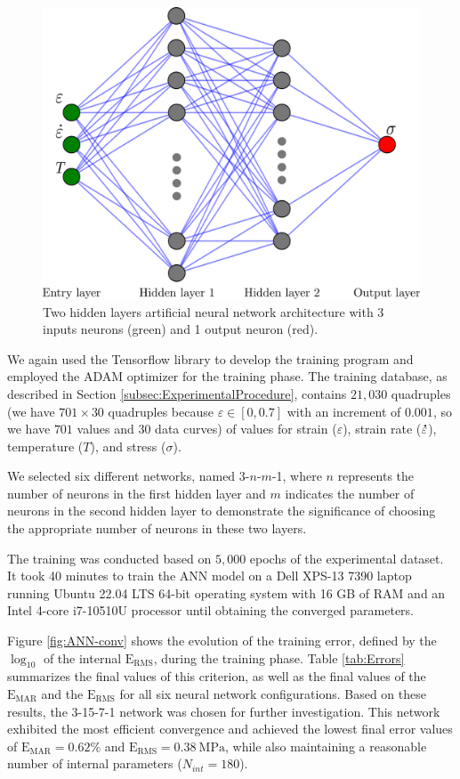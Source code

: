 \documentclass[metals,article,submit,pdftex,moreauthors]{Definitions/mdpi}
\DeclareRobustCommand{\mdot}[1]{\accentset{\mbox{\bfseries .}}{#1}}
\DeclareRobustCommand{\RMSE}{\text{E}_\text{RMS}}
\DeclareRobustCommand{\MARE}{\text{E}_\text{MAR}}
\DeclareRobustCommand{\MPa}{\text{MPa}}
\begin{document}
\begin{figure}[H]
\centering
\includegraphics[width=0.55\columnwidth]{Figures/ANN-scheme-2HL}
\caption{Two hidden layers artificial neural network architecture with 3 inputs neurons (green) and 1 output neuron (red).}
\label{fig:ANN-2HL}
\end{figure}

We again used the Tensorflow library to develop the training program and employed the ADAM optimizer for the training phase.
The training database, as described in Section \ref{subsec:ExperimentalProcedure}, contains $21,030$ quadruples (we have $701\times30$ quadruples because $\varepsilon\in[0,0.7]$ with an increment of $0.001$, so we have $701$ values and 30 data curves) of values for strain ($\varepsilon$), strain rate ($\mdot\varepsilon$), temperature ($T$), and stress ($\sigma$).

We selected six different networks, named 3-$n$-$m$-1, where $n$ represents the number of neurons in the first hidden layer and $m$ indicates the number of neurons in the second hidden layer to demonstrate the significance of choosing the appropriate number of neurons in these two layers.

The training was conducted based on $5,000$ epochs of the experimental dataset.
It took 40 minutes to train the ANN model on a Dell XPS-13 7390 laptop running Ubuntu 22.04 LTS 64-bit operating system with 16 GB of RAM and an Intel 4-core i7-10510U processor until obtaining the converged parameters.

Figure \ref{fig:ANN-conv} shows the evolution of the training error, defined by the $\log_{10}$ of the internal $\RMSE$, during the training phase.
Table \ref{tab:Errors} summarizes the final values of this criterion, as well as the final values of the $\MARE$ and the $\RMSE$ for all six neural network configurations.
Based on these results, the 3-15-7-1 network was chosen for further investigation.
This network exhibited the most efficient convergence and achieved the lowest final error values of $\MARE=0.62\%$ and $\RMSE=0.38~\MPa$, while also maintaining a reasonable number of internal parameters ($N_{int}=180$).
\end{document}

